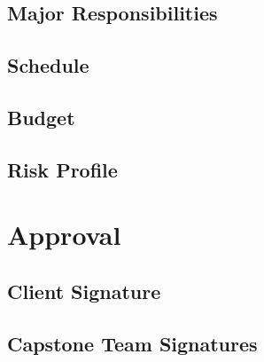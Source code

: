 \documentclass[10pt,letterpaper]{article}
\begin{document}
\subsection{Major Responsibilities}


\subsection{Schedule}


\subsection{Budget}\label{budget}


\subsection{Risk Profile}\label{risk}


\clearpage
\section{Approval}




\subsection*{Client Signature}


\subsection*{Capstone Team Signatures}


\clearpage
{}



\end{document}
